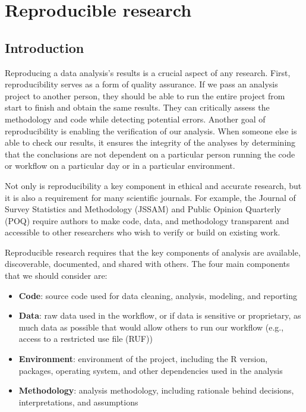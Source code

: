 \documentclass[
]{krantz}
\providecommand{\tightlist}{%
  \setlength{\itemsep}{0pt}\setlength{\parskip}{0pt}}
\begin{document}
\hypertarget{c09-reprex-data}{%
\chapter{Reproducible research}\label{c09-reprex-data}}

\hypertarget{introduction-7}{%
\section{Introduction}\label{introduction-7}}

Reproducing a data analysis's results is a crucial aspect of any research. First, reproducibility serves as a form of quality assurance. If we pass an analysis project to another person, they should be able to run the entire project from start to finish and obtain the same results. They can critically assess the methodology and code while detecting potential errors. Another goal of reproducibility is enabling the verification of our analysis. When someone else is able to check our results, it ensures the integrity of the analyses by determining that the conclusions are not dependent on a particular person running the code or workflow on a particular day or in a particular environment.

Not only is reproducibility a key component in ethical and accurate research, but it is also a requirement for many scientific journals. For example, the Journal of Survey Statistics and Methodology (JSSAM) and Public Opinion Quarterly (POQ) require authors to make code, data, and methodology transparent and accessible to other researchers who wish to verify or build on existing work.

Reproducible research requires that the key components of analysis are available, discoverable, documented, and shared with others. The four main components that we should consider are:

\begin{itemize}
\tightlist
\item
  \textbf{Code}: source code used for data cleaning, analysis, modeling, and reporting
\item
  \textbf{Data}: raw data used in the workflow, or if data is sensitive or proprietary, as much data as possible that would allow others to run our workflow (e.g., access to a restricted use file (RUF))
\item
  \textbf{Environment}: environment of the project, including the R version, packages, operating system, and other dependencies used in the analysis
\item
  \textbf{Methodology}: analysis methodology, including rationale behind decisions, interpretations, and assumptions
\end{itemize}
\end{document}
